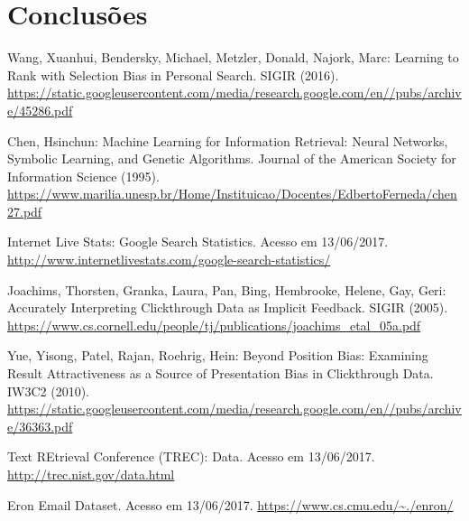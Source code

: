 \documentclass{svproc}
\begin{document}
\pagebreak


\section{Conclusões}


\begin{thebibliography}{6}
%

Wang, Xuanhui, Bendersky, Michael, Metzler, Donald, Najork, Marc: Learning to Rank with Selection Bias in Personal Search.
SIGIR (2016). \url{https://static.googleusercontent.com/media/research.google.com/en//pubs/archive/45286.pdf}

Chen, Hsinchun: Machine Learning for Information Retrieval: Neural Networks, Symbolic Learning, and Genetic Algorithms.
Journal of the American Society for Information Science (1995). \url{https://www.marilia.unesp.br/Home/Instituicao/Docentes/EdbertoFerneda/chen27.pdf}

Internet Live Stats: Google Search Statistics.
Acesso em 13/06/2017. \url{http://www.internetlivestats.com/google-search-statistics/}

Joachims, Thorsten, Granka, Laura, Pan, Bing, Hembrooke, Helene, Gay, Geri: Accurately Interpreting Clickthrough Data as Implicit
Feedback.
SIGIR (2005). \url{https://www.cs.cornell.edu/people/tj/publications/joachims_etal_05a.pdf}

Yue, Yisong, Patel, Rajan, Roehrig, Hein: Beyond Position Bias: Examining Result Attractiveness as
a Source of Presentation Bias in Clickthrough Data.
IW3C2 (2010). \url{https://static.googleusercontent.com/media/research.google.com/en//pubs/archive/36363.pdf}

Text REtrieval Conference (TREC): Data.
Acesso em 13/06/2017. \url{http://trec.nist.gov/data.html}

Eron Email Dataset.
Acesso em 13/06/2017. \url{https://www.cs.cmu.edu/~./enron/}

\end{thebibliography}
\end{document}
